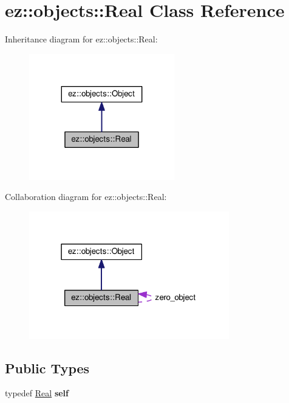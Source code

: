 \hypertarget{classez_1_1objects_1_1Real}{}\section{ez\+:\+:objects\+:\+:Real Class Reference}
\label{classez_1_1objects_1_1Real}


Inheritance diagram for ez\+:\+:objects\+:\+:Real\+:
\nopagebreak
\begin{figure}[H]
\begin{center}
\leavevmode
\includegraphics[width=179pt]{classez_1_1objects_1_1Real__inherit__graph}
\end{center}
\end{figure}


Collaboration diagram for ez\+:\+:objects\+:\+:Real\+:
\nopagebreak
\begin{figure}[H]
\begin{center}
\leavevmode
\includegraphics[width=247pt]{classez_1_1objects_1_1Real__coll__graph}
\end{center}
\end{figure}
\subsection*{Public Types}
\begin{DoxyCompactItemize}
\item 
\mbox{\label{classez_1_1objects_1_1Real_a569abe480291a8f3501b272de3fdec42}} 
typedef \hyperlink{classez_1_1objects_1_1Real}{Real} {\bfseries self}
\end{DoxyCompactItemize}
